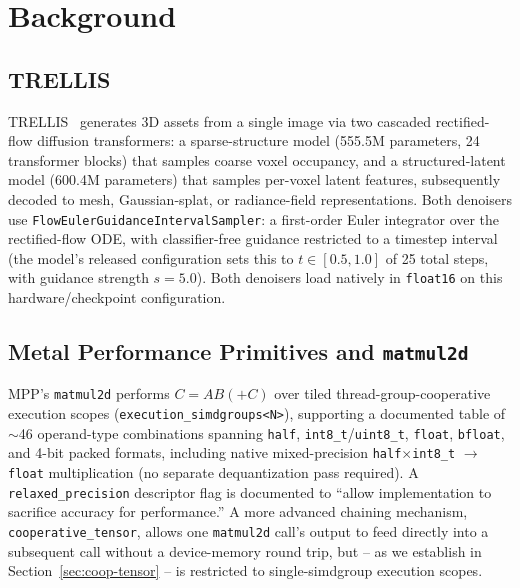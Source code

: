 \documentclass[11pt]{article}
\newcommand{\code}[1]{\texttt{#1}}
\begin{document}
\section{Background}
\label{sec:background}

\subsection{TRELLIS}
TRELLIS~\cite{trellis2024} generates 3D assets from a single image via two cascaded rectified-flow
diffusion transformers: a sparse-structure model (555.5M parameters, 24 transformer blocks) that
samples coarse voxel occupancy, and a structured-latent model (600.4M parameters) that samples
per-voxel latent features, subsequently decoded to mesh, Gaussian-splat, or radiance-field
representations. Both denoisers use \code{FlowEulerGuidanceIntervalSampler}: a first-order Euler
integrator over the rectified-flow ODE, with classifier-free guidance restricted to a timestep
interval (the model's released configuration sets this to $t \in [0.5, 1.0]$ of 25 total steps,
with guidance strength $s = 5.0$). Both denoisers load natively in \code{float16} on this
hardware/checkpoint configuration.

\subsection{Metal Performance Primitives and \code{matmul2d}}
MPP's \code{matmul2d} performs $C = AB (+ C)$ over tiled thread-group-cooperative execution scopes
(\code{execution\_simdgroups<N>}), supporting a documented table of $\sim$46 operand-type
combinations spanning \code{half}, \code{int8\_t}/\code{uint8\_t}, \code{float}, \code{bfloat},
and 4-bit packed formats, including native mixed-precision \code{half}$\times$\code{int8\_t}
$\rightarrow$\code{float} multiplication (no separate dequantization pass required). A
\code{relaxed\_precision} descriptor flag is documented to ``allow implementation to sacrifice
accuracy for performance.'' A more advanced chaining mechanism, \code{cooperative\_tensor}, allows
one \code{matmul2d} call's output to feed directly into a subsequent call without a device-memory
round trip, but -- as we establish in Section~\ref{sec:coop-tensor} -- is restricted to
single-simdgroup execution scopes.
\end{document}
